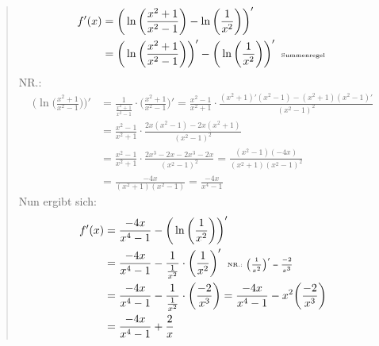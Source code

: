 \begin{quote}
	\begin{align*}
	f'(x)&=\bigg (\ln\bigg(\frac{x^2+1}{x^2-1}\bigg)-\ln\bigg(\frac{1}{x^2}\bigg)\bigg)'\\
	&=\bigg(\ln\bigg(\frac{x^2+1}{x^2-1}\bigg)\bigg)'-\bigg(\ln\bigg(\frac{1}{x^2}\bigg)\bigg)'\;\;\text{\tiny Summenregel }\\
	\end{align*}
	NR.:\\
	\begin{align*}
	\bigg(\ln\bigg(\frac{x^2+1}{x^2-1}\bigg)\bigg)'&=\frac{1}{\frac{x^2+1}{x^2-1}}\cdot \bigg(\frac{x^2+1}{x^2-1}\bigg)'=\frac{x^2-1}{x^2+1}\cdot\frac{(x^2+1)'(x^2-1)-(x^2+1)(x^2-1)'}{(x^2-1)^2}\\
	&=\frac{x^2-1}{x^2+1}\cdot\frac{2x(x^2-1)-2x(x^2+1)}{(x^2-1)^2}\\
	&=\frac{x^2-1}{x^2+1}\cdot\frac{2x^3-2x-2x^3-2x}{(x^2-1)^2}=\frac{(x^2-1)(-4x)}{(x^2+1)(x^2-1)^2}\\
	&=\frac{-4x}{(x^2+1)(x^2-1)}=\frac{-4x}{x^4-1}
	\end{align*}
	Nun ergibt sich:\\
	\begin{align*}
	f'(x)&=\frac{-4x}{x^4-1}-\bigg(\ln\bigg(\frac{1}{x^2}\bigg)\bigg)'\\
	&=\frac{-4x}{x^4-1}-\frac{1}{\frac{1}{x^2}}\cdot\bigg(\frac{1}{x^2}\bigg)'\;\;\text{\tiny NR.: $\bigg(\frac{1}{x^2}\bigg)'=\frac{-2}{x^3} $}\\
	&=\frac{-4x}{x^4-1}-\frac{1}{\frac{1}{x^2}}\cdot\bigg(\frac{-2}{x^3}\bigg)=\frac{-4x}{x^4-1}-x^2\bigg(\frac{-2}{x^3}\bigg)\\
	&=\frac{-4x}{x^4-1}+\frac{2}{x}
	\end{align*}
\end{quote}
